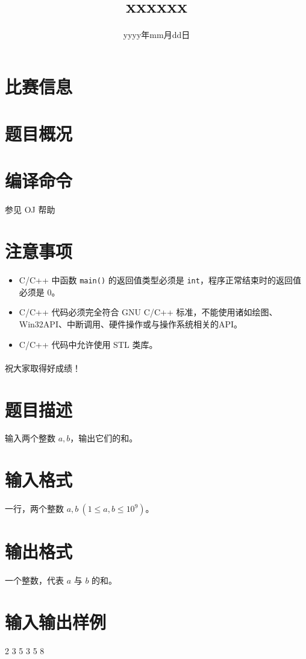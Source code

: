 \documentclass{ctpro}
\title{xxxxxx}
\date{yyyy年mm月dd日}
\begin{document}
\maketitle
{}

\section*{比赛信息}


\section*{题目概况}

\problemtab

\section*{编译命令}

参见 OJ 帮助

\section*{注意事项}

\begin{itemize}
    \item C/C++ 中函数 \verb|main()| 的返回值类型必须是 \verb|int|，程序正常结束时的返回值必须是 0。
    \item C/C++ 代码必须完全符合 GNU C/C++ 标准，不能使用诸如绘图、Win32API、中断调用、硬件操作或与操作系统相关的API。
    \item C/C++ 代码中允许使用 STL 类库。
\end{itemize}

\paragraph*{} 祝大家取得好成绩！

\makeproblem
\section*{题目描述}

输入两个整数 $a,b$，输出它们的和。

\section*{输入格式}

一行，两个整数 $a,b~(1 \leq a,b \leq 10^9)$。

\section*{输出格式}

一个整数，代表 $a$ 与 $b$ 的和。

\section*{输入输出样例}

\testcasetab
{
    2 3
}
{
    5
}
\testcasetab
{
    3 5
}
{
    8
}
\end{document}
